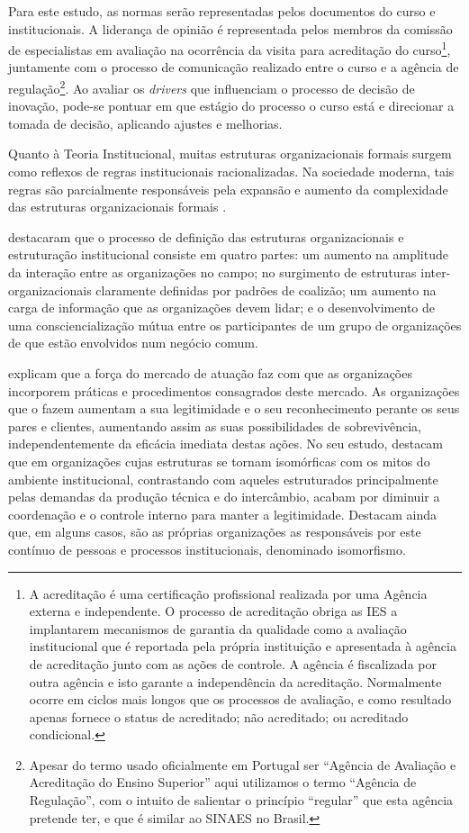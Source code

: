 \documentclass{textolivre}
\begin{document}
Para este estudo, as normas serão representadas pelos documentos do curso e institucionais. A liderança de opinião é representada pelos membros da comissão de especialistas em avaliação na ocorrência da visita para acreditação do curso\footnote{A acreditação é uma certificação profissional realizada por uma Agência externa e independente. O processo de acreditação obriga as IES a implantarem mecanismos de garantia da qualidade como a avaliação institucional que é reportada pela própria instituição e apresentada à agência de acreditação junto com as ações de controle. A agência é fiscalizada por outra agência e isto garante a independência da acreditação. Normalmente ocorre em ciclos mais longos que os processos de avaliação, e como resultado apenas fornece o status de acreditado; não acreditado; ou acreditado condicional.}, juntamente com o processo de comunicação realizado entre o curso e a agência de regulação\footnote{Apesar do termo usado oficialmente em Portugal ser “Agência de Avaliação e Acreditação do Ensino Superior” aqui utilizamos o termo “Agência de Regulação”, com o intuito de salientar o princípio “regular” que esta agência pretende ter, e que é similar ao SINAES no Brasil.}. Ao avaliar os \textit{drivers} que influenciam o processo de decisão de inovação, pode-se pontuar em que estágio do processo o curso está e direcionar a tomada de decisão, aplicando ajustes e melhorias.

Quanto à Teoria Institucional, muitas estruturas organizacionais formais surgem como reflexos de regras institucionais racionalizadas. Na sociedade moderna, tais regras são parcialmente responsáveis pela expansão e aumento da complexidade das estruturas organizacionais formais \cite{meyer1977}.

\textcite[p. 148]{dimaggio1983} destacaram que o processo de definição das estruturas organizacionais e estruturação institucional consiste em quatro partes: um aumento na amplitude da interação entre as organizações no campo; no surgimento de estruturas inter-organizacionais claramente definidas por padrões de coalizão; um aumento na carga de informação que as organizações devem lidar; e o desenvolvimento de uma consciencialização mútua entre os participantes de um grupo de organizações de que estão envolvidos num negócio comum.

\textcite{meyer1977} explicam que a força do mercado de atuação faz com que as organizações incorporem práticas e procedimentos consagrados deste mercado. As organizações que o fazem aumentam a sua legitimidade e o seu reconhecimento perante os seus pares e clientes, aumentando assim as suas possibilidades de sobrevivência, independentemente da eficácia imediata destas ações.
No seu estudo, \textcite{meyer1977} destacam que em organizações cujas estruturas se tornam isomórficas com os mitos do ambiente institucional, contrastando com aqueles estruturados principalmente pelas demandas da produção técnica e do intercâmbio, acabam por diminuir a coordenação e o controle interno para manter a legitimidade. Destacam ainda que, em alguns casos, são as próprias organizações as responsáveis por este contínuo de pessoas e processos institucionais, denominado isomorfismo.
\end{document}
